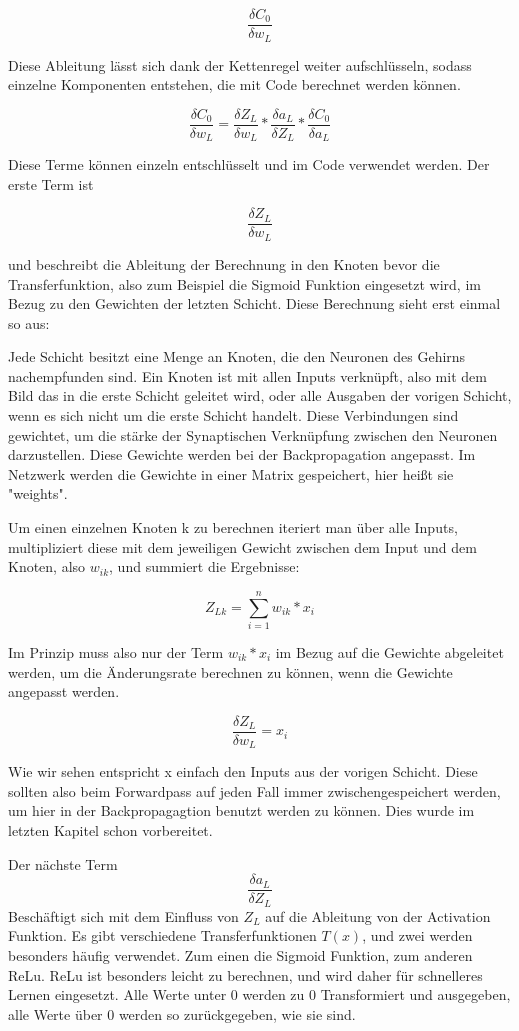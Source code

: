 \documentclass[12pt]{article}
\begin{document}
$$\frac{\delta C_0}{\delta w_L}$$

Diese Ableitung lässt sich dank der Kettenregel weiter aufschlüsseln, sodass einzelne Komponenten entstehen, die mit Code berechnet werden können.

$$\frac{\delta C_0}{\delta w_L}=
\frac{\delta Z_L}{\delta w_L}*
\frac{\delta a_L}{\delta Z_L}*
\frac{\delta C_0}{\delta a_L}$$

Diese Terme können einzeln entschlüsselt und im Code verwendet werden. Der erste Term ist

$$\frac{\delta Z_L}{\delta w_L}$$

und beschreibt die Ableitung der Berechnung in den Knoten bevor die Transferfunktion, also zum Beispiel die Sigmoid Funktion eingesetzt wird, im Bezug zu den Gewichten der letzten Schicht.
Diese Berechnung sieht erst einmal so aus:

Jede Schicht besitzt eine Menge an Knoten, die den Neuronen des Gehirns nachempfunden sind. Ein Knoten ist mit allen Inputs verknüpft, also mit dem Bild das in die erste Schicht geleitet wird, oder alle Ausgaben der vorigen Schicht, wenn es sich nicht um die erste Schicht handelt. Diese Verbindungen sind gewichtet, um die stärke der Synaptischen Verknüpfung zwischen den Neuronen darzustellen. Diese Gewichte werden bei der Backpropagation angepasst. Im Netzwerk werden die Gewichte in einer Matrix gespeichert, hier heißt sie "weights". 

Um einen einzelnen Knoten k zu berechnen iteriert man über alle Inputs, multipliziert diese mit dem jeweiligen Gewicht zwischen dem Input und dem Knoten, also $w_{ik}$, und summiert die Ergebnisse:


$$Z_{Lk}=\sum_{i = 1}^{n}w_{ik}*x_i$$

Im Prinzip muss also nur der Term $w_{ik}*x_i$ im Bezug auf die Gewichte abgeleitet werden, um die Änderungsrate berechnen zu können, wenn die Gewichte angepasst werden.

$$\frac{\delta Z_L}{\delta w_L}=x_i$$

Wie wir sehen entspricht x einfach den Inputs aus der vorigen Schicht. Diese sollten also beim Forwardpass auf jeden Fall immer zwischengespeichert werden, um hier in der Backpropagagtion benutzt werden zu können. Dies wurde im letzten Kapitel schon vorbereitet.

Der nächste Term 
$$\frac{\delta a_L}{\delta Z_L}$$ Beschäftigt sich mit dem Einfluss von $Z_L$ auf die Ableitung von der Activation Funktion. Es gibt verschiedene Transferfunktionen $T(x)$, und zwei werden besonders häufig verwendet. Zum einen die Sigmoid Funktion, zum anderen ReLu. 
ReLu ist besonders leicht zu berechnen, und wird daher für schnelleres Lernen eingesetzt. Alle Werte unter 0 werden zu 0 Transformiert und ausgegeben, alle Werte über 0 werden so zurückgegeben, wie sie sind.
\end{document}
